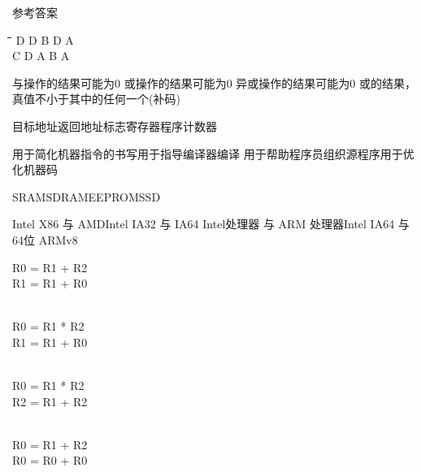 \documentclass[12pt]{article}
\begin{document}
\begin{frame}{}
   \begin{block}{参考答案}
           \centering

   \begin{tabbing}
      \hspace{.1\textwidth}\=
      \hspace{.1\textwidth}\=
      \hspace{.1\textwidth}\=
      \hspace{.1\textwidth}\=
      \hspace{.1\textwidth}\=
      \hspace{.1\textwidth}\=\kill
      \> D \> D \> B \> D \> A \\
      \> C \> D \> A \> B \> A
    \end{tabbing}
   \end{block}
\end{frame}

\begin{frame}{}
{与操作的结果可能为0}
{或操作的结果可能为0}
{异或操作的结果可能为0}
{或的结果，真值不小于其中的任何一个(补码)}
\end{frame}

\begin{frame}{}
 {目标地址}{返回地址}{标志寄存器}{程序计数器}
\end{frame}

\begin{frame}{}
    {用于简化机器指令的书写}{用于指导编译器编译}
    {用于帮助程序员组织源程序}{用于优化机器码}
\end{frame}

\begin{frame}{}
    {SRAM}{SDRAM}{EEPROM}{SSD}
\end{frame}

\begin{frame}{}
    {Intel X86 与 AMD}{Intel IA32 与 IA64}
    {Intel处理器 与 ARM 处理器}{Intel IA64 与 64位 ARMv8}
\end{frame}

\begin{frame}{}
{\parbox[t]{3cm}{R0 = R1 + R2\\ R1 = R1 + R0\\~}}
{\parbox[t]{3cm}{R0 = R1 * R2\\ R1 = R1 + R0\\~}}
{\parbox[t]{3cm}{R0 = R1 * R2\\ R2 = R1 + R2\\~}}
{\parbox[t]{3cm}{R0 = R1 + R2\\ R0 = R0 + R0}}
\end{frame}
\end{document}
